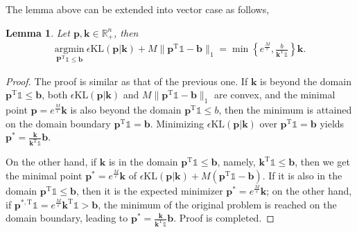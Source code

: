 \documentclass[11pt]{book}
\newtheorem{lemma}[theorem]{Lemma}
\begin{document}
The lemma above can be extended into vector case as follows,
\begin{lemma}\label{lemma:OT_min02}
Let $\mathbf{p}, \mathbf{k}\in\mathbb{R}_+^n$, then
\begin{align}
    \underset{\mathbf{P}^{\mathrm{T}}\mathbb{1}\le \mathbf{b}}{\mathrm{argmin}}\ \epsilon\mathrm{KL}(\mathbf{p}|\mathbf{k}) + M \| \mathbf{p}^{\mathrm{T}}\mathbb{1}-\mathbf{b} \|_1 = \min \left\{ e^{\frac{M}{\epsilon}}, \frac{b}{\mathbf{k}^{\mathrm{T}}\mathbb{1}}  \right\} \mathbf{k}.
\end{align}
\end{lemma}
\begin{proof}
The proof is similar as that of the previous one. If $\mathbf{k}$ is beyond the domain $\mathbf{p}^{\mathrm{T}}\mathbb{1}\le \mathbf{b}$, both $\epsilon\mathrm{KL}(\mathbf{p}|\mathbf{k})$ and $M \| \mathbf{p}^{\mathrm{T}}\mathbb{1}-\mathbf{b} \|_1 $ are convex, and the minimal point $\mathbf{p} = e^{\frac{M}{\epsilon}}\mathbf{k}$ is also beyond the domain $\mathbf{p}^{\mathrm{T}}\mathbb{1}\le b$, then the minimum is attained on the domain boundary $\mathbf{p}^{\mathrm{T}}\mathbb{1} = \mathbf{b}$. Minimizing $\epsilon\mathrm{KL}(\mathbf{p}|\mathbf{k})$ over $\mathbf{p}^{\mathrm{T}}\mathbb{1} = \mathbf{b}$ yields $\mathbf{p}^* = \frac{\mathbf{k}}{\mathbf{k}^{\mathrm{T}}\mathbb{1}}\mathbf{b}$. 

On the other hand, if $\mathbf{k}$ is in the domain $\mathbf{p}^{\mathrm{T}}\mathbb{1} \le \mathbf{b}$, namely, $\mathbf{k}^{\mathrm{T}}\mathbb{1}\le \mathbf{b}$, then we get the minimal point $\mathbf{p}^* = e^{\frac{M}{\epsilon}}\mathbf{k}$ of $\epsilon\mathrm{KL}(\mathbf{p}|\mathbf{k}) + M  ( \mathbf{p}^{\mathrm{T}}\mathbb{1}-\mathbf{b} )$. If it is also in the domain $\mathbf{p}^{\mathrm{T}}\mathbb{1}\le \mathbf{b}$, then it is the expected minimizer $\mathbf{p}^* = e^{\frac{M}{\epsilon}}\mathbf{k}$; on the other hand, if $\mathbf{p}^{*,\mathrm{T}}\mathbb{1} = e^{\frac{M}{\epsilon}}\mathbf{k}^{\mathrm{T}}\mathbb{1} > \mathbf{b}$, the minimum of the original problem is reached on the domain boundary, leading to $\mathbf{p}^* = \frac{\mathbf{k}}{\mathbf{k}^{\mathrm{T}}\mathbb{1}}\mathbf{b}$. Proof is completed.
\end{proof}
\end{document}
